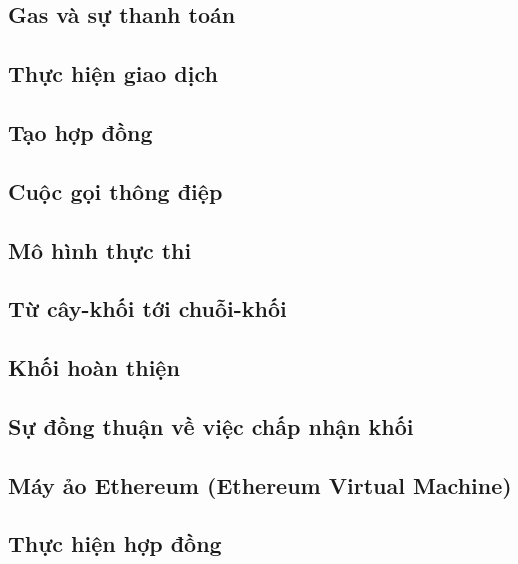 \documentclass[12pt]{article}
\begin{document}
	\subsection{Gas và sự thanh toán}
	
	
	\subsection{Thực hiện giao dịch}
	
	
	\subsection{Tạo hợp đồng}
		

	\subsection{Cuộc gọi thông điệp}
			
	
	\subsection{Mô hình thực thi}
			
	
	\subsection{Từ cây-khối tới chuỗi-khối}
	
	
	\subsection{Khối hoàn thiện}
	
	
	\subsection{Sự đồng thuận về việc chấp nhận khối}
	

	\subsection{Máy ảo Ethereum (Ethereum Virtual Machine)}
	
	
	\subsection{Thực hiện hợp đồng}
	
	
\end{document}
